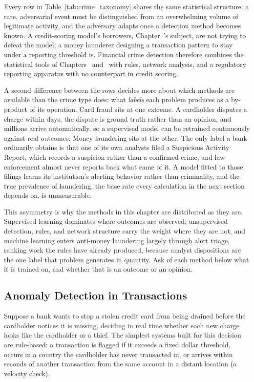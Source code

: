 \documentclass[../ai_in_finance]{subfiles}
\begin{document}
Every row in Table~\ref{tab:crime_taxonomy} shares the same statistical structure: a rare, adversarial event must be distinguished from an overwhelming volume of legitimate activity, and the adversary adapts once a detection method becomes known. A credit-scoring model's borrowers, Chapter~'s subject, are not trying to defeat the model; a money launderer designing a transaction pattern to stay under a reporting threshold is. Financial crime detection therefore combines the statistical tools of Chapters~ and~ with rules, network analysis, and a regulatory reporting apparatus with no counterpart in credit scoring.

A second difference between the rows decides more about which methods are available than the crime type does: what \emph{labels} each problem produces as a by-product of its operation. Card fraud sits at one extreme. A cardholder disputes a charge within days, the dispute is ground truth rather than an opinion, and millions arrive automatically, so a supervised model can be retrained continuously against real outcomes. Money laundering sits at the other. The only label a bank ordinarily obtains is that one of its own analysts filed a Suspicious Activity Report, which records a suspicion rather than a confirmed crime, and law enforcement almost never reports back what came of it. A model fitted to those filings learns its institution's alerting behavior rather than criminality, and the true prevalence of laundering, the base rate every calculation in the next section depends on, is unmeasurable.

This asymmetry is why the methods in this chapter are distributed as they are. Supervised learning dominates where outcomes are observed; unsupervised detection, rules, and network structure carry the weight where they are not; and machine learning enters anti-money laundering largely through alert triage, ranking work the rules have already produced, because analyst dispositions are the one label that problem generates in quantity. Ask of each method below what it is trained on, and whether that is an outcome or an opinion.

\subsection{Anomaly Detection in Transactions}
\label{sec:anomaly-bayes}

Suppose a bank wants to stop a stolen credit card from being drained before the cardholder notices it is missing, deciding in real time whether each new charge looks like the cardholder or a thief. The simplest systems built for this decision are rule-based: a transaction is flagged if it exceeds a fixed dollar threshold, occurs in a country the cardholder has never transacted in, or arrives within seconds of another transaction from the same account in a distant location (a velocity check).
\end{document}
